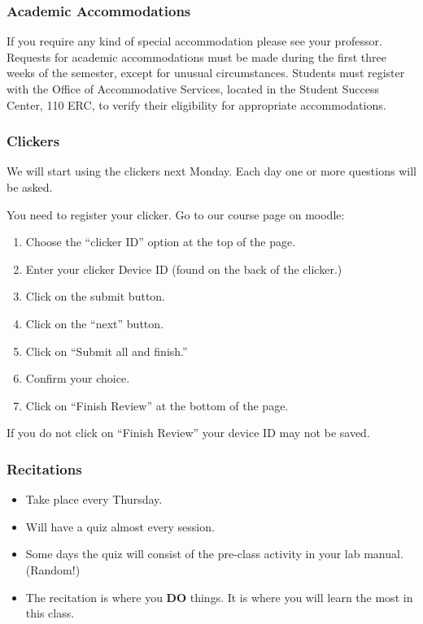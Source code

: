 \begin{frame}
  \frametitle{Academic Accommodations}

  If you require any kind of special
  accommodation please see your professor.  Requests for academic
  accommodations must be made during the first three weeks of the
  semester, except for unusual circumstances.  Students must register
  with the Office of Accommodative Services, located in the Student
  Success Center, 110 ERC, to verify their eligibility for appropriate
  accommodations.
  
\end{frame}

\begin{frame}
  \frametitle{Clickers}

  We will start using the clickers next Monday. Each day one or more
  questions will be asked.

  You need to register your clicker. Go to our course page on moodle:
  \begin{enumerate}
  \item Choose the ``clicker ID'' option at the top of the page.
  \item Enter your clicker Device ID (found on the back of the
    clicker.)
  \item Click on the submit button.
  \item Click on the ``next'' button.
  \item Click on ``Submit all and finish.''
  \item Confirm your choice.
  \item Click on ``Finish Review'' at the bottom of the page.
  \end{enumerate}

  If you do not click on ``Finish Review'' your device ID may not be saved.
   
  
\end{frame}



\begin{frame}
  \frametitle{Recitations}

  \begin{itemize}
  \item Take place every Thursday.
  \item Will have a quiz almost every session.
  \item Some days the quiz will consist of the pre-class activity in
    your lab manual. (Random!)
  \item The recitation is where you \textbf{DO} things. It is where
    you will learn the most in this class.
  \end{itemize}
\end{frame}

